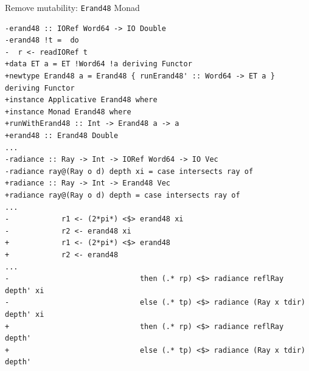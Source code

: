 \documentclass[8pt]{beamer}
\begin{document}
\begin{frame}[fragile]{Remove mutability: \texttt{Erand48} Monad}


\begin{verbatim}
-erand48 :: IORef Word64 -> IO Double
-erand48 !t =  do
-  r <- readIORef t
+data ET a = ET !Word64 !a deriving Functor
+newtype Erand48 a = Erand48 { runErand48' :: Word64 -> ET a } deriving Functor
+instance Applicative Erand48 where
+instance Monad Erand48 where
+runWithErand48 :: Int -> Erand48 a -> a                                                                                                
+erand48 :: Erand48 Double
...
-radiance :: Ray -> Int -> IORef Word64 -> IO Vec
-radiance ray@(Ray o d) depth xi = case intersects ray of
+radiance :: Ray -> Int -> Erand48 Vec
+radiance ray@(Ray o d) depth = case intersects ray of
...
-            r1 <- (2*pi*) <$> erand48 xi
-            r2 <- erand48 xi
+            r1 <- (2*pi*) <$> erand48
+            r2 <- erand48
...
-                              then (.* rp) <$> radiance reflRay depth' xi
-                              else (.* tp) <$> radiance (Ray x tdir) depth' xi
+                              then (.* rp) <$> radiance reflRay depth'
+                              else (.* tp) <$> radiance (Ray x tdir) depth'
\end{verbatim}


\end{frame}
\end{document}
